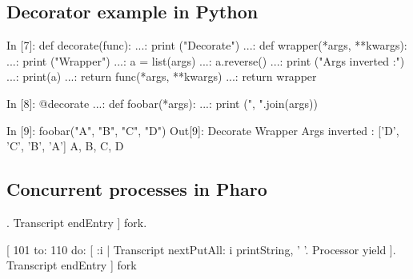 \documentclass[12pt,a4paper]{scrartcl}
\begin{document}
\subsection{Decorator example in Python}
\label{code:pythonDecorator}
\begin{python}
In [7]: def decorate(func):
   ...:     print ("Decorate")
   ...:     def wrapper(*args, **kwargs):
   ...:         print ("Wrapper")
   ...:         a = list(args)
   ...:         a.reverse()
   ...:         print ("Args inverted :")
   ...:         print(a)
   ...:         return func(*args, **kwargs)
   ...:     return wrapper

In [8]: @decorate
   ...: def foobar(*args):
   ...:   print (", ".join(args))

In [9]: foobar("A", "B", "C", "D")
Out[9]: Decorate
        Wrapper
        Args inverted :
        ['D', 'C', 'B', 'A']
        A, B, C, D


\end{python}


\subsection{Concurrent processes in Pharo}
\label{code:SmallTalkfork}
\begin{ST}
[ 1 to: 10 do: [ :i |
  Transcript nextPutAll: i printString, ' '.
  Processor yield ].
Transcript endEntry ] fork.

[ 101 to: 110 do: [ :i |
  Transcript nextPutAll: i  printString, ' '.
  Processor yield ].
Transcript endEntry ] fork
\end{ST}
\end{document}
